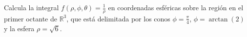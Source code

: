 Calcula la integral \( f(\rho, \phi, \theta) = \frac{1}{\rho} \) en coordenadas esféricas sobre la región en el primer octante de \( \mathbb{R}^3 \), que está delimitada por los conos \( \phi = \frac{\pi}{4} \), \( \phi = \arctan(2) \) y la esfera \( \rho = \sqrt{6} \).
